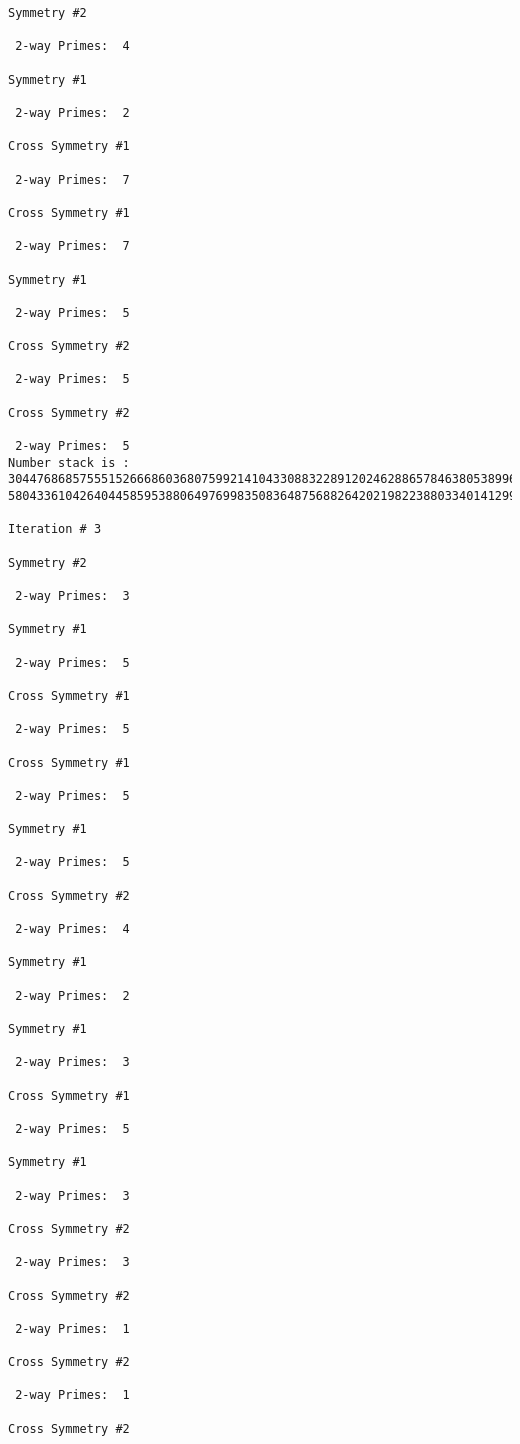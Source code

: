 {{{{\begin{verbatim}
Symmetry #2

 2-way Primes: 	4

Symmetry #1

 2-way Primes: 	2

Cross Symmetry #1

 2-way Primes: 	7

Cross Symmetry #1

 2-way Primes: 	7

Symmetry #1

 2-way Primes: 	5

Cross Symmetry #2

 2-way Primes: 	5

Cross Symmetry #2

 2-way Primes: 	5
Number stack is :
30447686857555152666860368075992141043308832289120246288657846380538996794608835958544046240163340857
58043361042640445859538806497699835083648756882642021982238803340141299570863068666251555758686744037

Iteration #	3

Symmetry #2

 2-way Primes: 	3

Symmetry #1

 2-way Primes: 	5

Cross Symmetry #1

 2-way Primes: 	5

Cross Symmetry #1

 2-way Primes: 	5

Symmetry #1

 2-way Primes: 	5

Cross Symmetry #2

 2-way Primes: 	4

Symmetry #1

 2-way Primes: 	2

Symmetry #1

 2-way Primes: 	3

Cross Symmetry #1

 2-way Primes: 	5

Symmetry #1

 2-way Primes: 	3

Cross Symmetry #2

 2-way Primes: 	3

Cross Symmetry #2

 2-way Primes: 	1

Cross Symmetry #2

 2-way Primes: 	1

Cross Symmetry #2


\end{verbatim}}}}}
